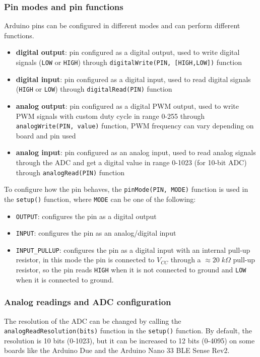\subsubsection*{Pin modes and pin functions}
Arduino pins can be configured in different modes and can perform different functions.
\begin{itemize}
	\item \textbf{digital output}: pin configured as a digital output, used to write digital signals (\texttt{LOW} or
	\texttt{HIGH}) through \texttt{digitalWrite(PIN, [HIGH,LOW])} function
	\item \textbf{digital input}: pin configured as a digital input, used to read digital signals (\texttt{HIGH} or
	\texttt{LOW}) through \texttt{digitalRead(PIN)} function
	\item \textbf{analog output}: pin configured as a digital PWM output, used to write PWM signals with custom duty cycle in
	range 0-255 through \texttt{analogWrite(PIN, value)} function, PWM frequency can vary depending on board and pin used
	\item \textbf{analog input}: pin configured as an analog input, used to read analog signals through the ADC and get
	a digital value in range 0-1023 (for 10-bit ADC) through \texttt{analogRead(PIN)} function
\end{itemize}

\noindent
To configure how the pin behaves, the \texttt{pinMode(PIN, MODE)} function is used in the \texttt{setup()} function, where
\texttt{MODE} can be one of the following:
\begin{itemize}
	\item \texttt{OUTPUT}: configures the pin as a digital output
	\item \texttt{INPUT}: configures the pin as an analog/digital input
	\item \texttt{INPUT\_PULLUP}: configures the pin as a digital input with an internal pull-up resistor, in this mode the pin
	is connected to \(V_{CC}\) through a \(\approx 20 \; k\Omega\) pull-up resistor, so the pin reads \texttt{HIGH} when it is
	not connected to ground and \texttt{LOW} when it is connected to ground.
\end{itemize}

\subsubsection*{Analog readings and ADC configuration}
The resolution of the ADC can be changed by calling the \texttt{analogReadResolution(bits)} function in the \texttt{setup()}
function. By default, the resolution is 10 bits (0-1023), but it can be increased to 12 bits (0-4095) on some boards like the
Arduino Due and the Arduino Nano 33 BLE Sense Rev2.

